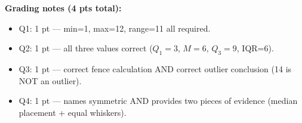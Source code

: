 \documentclass[10pt]{article}
\begin{document}
\begin{teachernote}
\textbf{Grading notes (4 pts total):}
\begin{itemize}[itemsep=2pt]
  \item Q1: 1 pt — min=1, max=12, range=11 all required.
  \item Q2: 1 pt — all three values correct ($Q_1=3$, $M=6$, $Q_3=9$, IQR=6).
  \item Q3: 1 pt — correct fence calculation AND correct outlier conclusion (14 is NOT an outlier).
  \item Q4: 1 pt — names symmetric AND provides two pieces of evidence (median placement + equal whiskers).
\end{itemize}
\end{teachernote}
\end{document}
